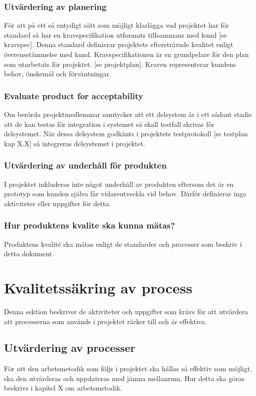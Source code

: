 \documentclass[a4paper,10pt]{article}
\begin{document}
\subsubsection{Utvärdering av planering}
För att på ett så entydigt sätt som möjligt klarlägga vad projektet har för standard så har en kravspecifikation utformats tillsammans med kund [se kravspec]. 
Denna standard definierar projektets eftersträvade kvalitet enligt överensstämmelse med kund.
Kravspecifikationen är en grundpelare för den plan som utarbetats för projektet. [se projektplan]. Kraven representerar kundens behov, önskemål och förväntningar. 
\subsubsection{Evaluate product for acceptability}
Om berörda projektmedlemmar samtycker att ett delsystem är i ett sådant stadie att de kan testas för integration i systemet så skall testfall skrivas för delsystemet. När dessa delsystem godkänts i projektets testprotokoll [se testplan kap X.X] så integreras delsystemet i projektet.
\subsubsection{Utvärdering av underhåll för produkten}
I projektet inkluderas inte något underhåll av produkten eftersom det är en prototyp som kunden själva får vidareutveckla vid behov. Därför definieras inga aktiviteter eller uppgifter för detta.
\subsubsection{Hur produktens kvalite ska kunna mätas?}
Produktens kvalité ska mätas enligt de standarder och processer som beskriv i detta dokument.
\section{Kvalitetssäkring av process}
Denna sektion beskriver de aktiviteter och uppgifter som krävs för att utvärdera att processerna som används i projektet räcker till och är effektiva.

\subsection{Utvärdering av processer}

För att den arbetsmetodik som följs i projektet ska hållas så effektiv som möjligt, ska den utvärderas och uppdateras med jämna mellanrum. Hur detta ska göras beskrivs i kapitel X om arbetsmetodik.
\end{document}
